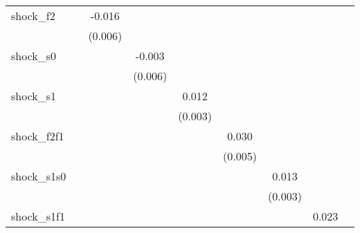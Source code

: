 {\begin{tabular}{l*{8}{c}}
\addlinespace
shock\_f2    &                     &      -0.016\sym{***}&                     &                     &                     &                     &                     &                     \\
            &                     &     (0.006)         &                     &                     &                     &                     &                     &                     \\
\addlinespace
shock\_s0    &                     &                     &      -0.003         &                     &                     &                     &                     &                     \\
            &                     &                     &     (0.006)         &                     &                     &                     &                     &                     \\
\addlinespace
shock\_s1    &                     &                     &                     &       0.012\sym{***}&                     &                     &                     &                     \\
            &                     &                     &                     &     (0.003)         &                     &                     &                     &                     \\
\addlinespace
shock\_f2f1  &                     &                     &                     &                     &       0.030\sym{***}&                     &                     &                     \\
            &                     &                     &                     &                     &     (0.005)         &                     &                     &                     \\
\addlinespace
shock\_s1s0  &                     &                     &                     &                     &                     &       0.013\sym{***}&                     &                     \\
            &                     &                     &                     &                     &                     &     (0.003)         &                     &                     \\
\addlinespace
shock\_s1f1  &                     &                     &                     &                     &                     &                     &       0.023\sym{***}&                     \\

\end{tabular}}
